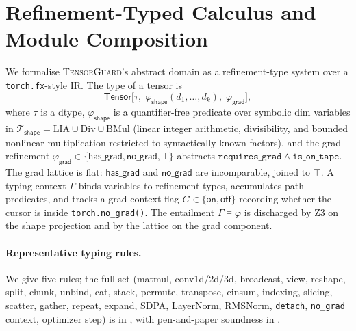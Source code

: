 \section{Refinement-Typed Calculus and Module Composition}
\label{sec:calculus}

We formalise \textsc{TensorGuard}'s abstract domain as a
refinement-type system over a \texttt{torch.fx}-style IR. The
type of a tensor is
\[
 \mathsf{Tensor}\bigl[\tau,\;\varphi_{\mathsf{shape}}(d_1,\dots,d_k),\;\varphi_{\mathsf{grad}}\bigr],
\]
where $\tau$ is a dtype, $\varphi_{\mathsf{shape}}$ is a
quantifier-free predicate over symbolic dim variables in
$\mathcal{T}_{\mathsf{shape}}=\mathrm{LIA}\cup\mathrm{Div}\cup\mathrm{BMul}$
(linear integer arithmetic, divisibility, and bounded
nonlinear multiplication restricted to syntactically-known
factors), and the grad refinement
$\varphi_{\mathsf{grad}}\in\{\mathsf{has\_grad},\mathsf{no\_grad},\top\}$
abstracts $\mathtt{requires\_grad}\wedge\mathtt{is\_on\_tape}$.
The grad lattice is flat: $\mathsf{has\_grad}$ and
$\mathsf{no\_grad}$ are incomparable, joined to $\top$. A
typing context $\Gamma$ binds variables to refinement types,
accumulates path predicates, and tracks a grad-context flag
$G\in\{\mathsf{on},\mathsf{off}\}$ recording whether the cursor
is inside \texttt{torch.no\_grad()}. The entailment
$\Gamma\models\varphi$ is discharged by Z3 on the shape
projection and by the lattice on the grad component.

\paragraph{Representative typing rules.}
We give five rules; the full set (matmul, conv1d/2d/3d,
broadcast, view, reshape, split, chunk, unbind, cat, stack,
permute, transpose, einsum, indexing, slicing, scatter,
gather, repeat, expand, SDPA, LayerNorm, RMSNorm,
\texttt{detach}, \texttt{no\_grad} context, optimizer step) is in
, with pen-and-paper soundness in
.

{\small
{}}

